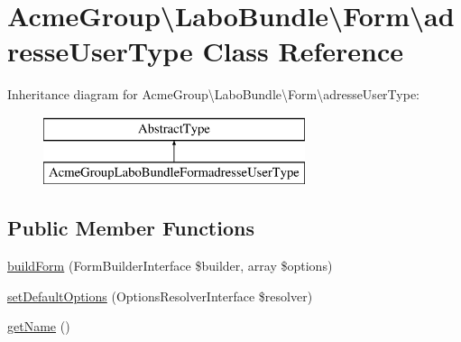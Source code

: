 \hypertarget{class_acme_group_1_1_labo_bundle_1_1_form_1_1adresse_user_type}{\section{Acme\+Group\textbackslash{}Labo\+Bundle\textbackslash{}Form\textbackslash{}adresse\+User\+Type Class Reference}
\label{class_acme_group_1_1_labo_bundle_1_1_form_1_1adresse_user_type}
}
Inheritance diagram for Acme\+Group\textbackslash{}Labo\+Bundle\textbackslash{}Form\textbackslash{}adresse\+User\+Type\+:\begin{figure}[H]
\begin{center}
\leavevmode
\includegraphics[height=2.000000cm]{class_acme_group_1_1_labo_bundle_1_1_form_1_1adresse_user_type}
\end{center}
\end{figure}
\subsection*{Public Member Functions}
\begin{DoxyCompactItemize}
\item 
\hyperlink{class_acme_group_1_1_labo_bundle_1_1_form_1_1adresse_user_type_a4a511c9801be46c5d62aa6a98b6ba43f}{build\+Form} (Form\+Builder\+Interface \$builder, array \$options)
\item 
\hyperlink{class_acme_group_1_1_labo_bundle_1_1_form_1_1adresse_user_type_a7bdda4d3df19a75e1b442c4fe83986cb}{set\+Default\+Options} (Options\+Resolver\+Interface \$resolver)
\item 
\hyperlink{class_acme_group_1_1_labo_bundle_1_1_form_1_1adresse_user_type_a717b13f46d410839480230ea3ce51258}{get\+Name} ()
\end{DoxyCompactItemize}


